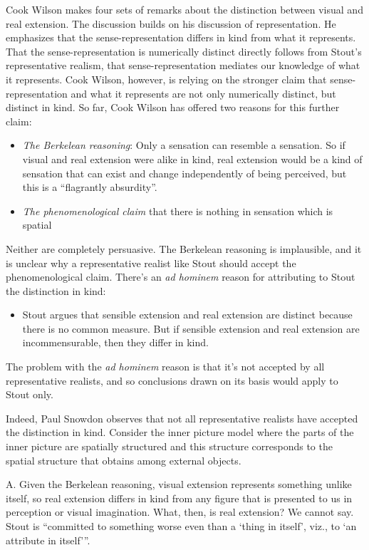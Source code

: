 \documentclass[11pt]{article}
\begin{document}
Cook Wilson makes four sets of remarks about the distinction between visual and real extension. The discussion builds on his discussion of representation. He emphasizes that the sense-representation differs in kind from what it represents. That the sense-representation is numerically distinct directly follows from Stout's representative realism, that sense-re\-pre\-sen\-ta\-tion mediates our knowledge of what it represents. Cook Wilson, however, is relying on the stronger claim that sense-representation and what it represents are not only numerically distinct, but distinct in kind. So far, Cook Wilson has offered two reasons for this further claim:
    \begin{itemize}
    	\item \emph{The Berkelean reasoning}: Only a sensation can resemble a sensation. So if visual and real extension were alike in kind, real extension would be a kind of sensation that can exist and change independently of being perceived, but this is a ``flagrantly absurdity''.
    	\item \emph{The phenomenological claim} that there is nothing in sensation which is spatial
    \end{itemize}
Neither are completely persuasive. The Berkelean reasoning is implausible, and it is unclear why a representative realist like Stout should accept the phenomenological claim. There's an \emph{ad hominem} reason for attributing to Stout the distinction in kind:
    \begin{itemize}
        \item Stout argues that sensible extension and real extension are distinct because there is no common measure. But if sensible extension and real extension are incommensurable, then they differ in kind.
    \end{itemize}
The problem with the \emph{ad hominem} reason is that it's not accepted by all representative realists, and so conclusions drawn on its basis would apply to Stout only. 

\begin{discussion}
	Indeed, Paul Snowdon observes that not all representative realists have accepted the distinction in kind. Consider the inner picture model where the parts of the inner picture are spatially structured and this structure corresponds to the spatial structure that obtains among external objects.
\end{discussion}


A. Given the Berkelean reasoning, visual extension represents something unlike itself, so real extension differs in kind from any figure that is presented to us in perception or visual imagination. What, then, is real extension? We cannot say. Stout is ``committed to something worse even than a `thing in itself', viz., to `an attribute in itself'''.
\end{document}
